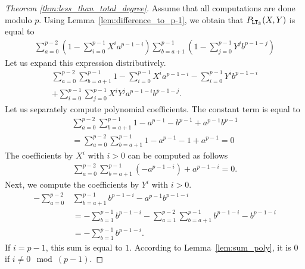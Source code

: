   \begin{proof}[Theorem \ref{thm:less_than_total_degree}]
    Assume that all computations are done modulo $p$.
    Using Lemma~\ref{lem:difference_to_p-1}, we obtain that $P_{\mathtt{LT}_{\mathcal{S}}}(X,Y)$ is equal to
    \begin{align*}
      \sum_{a = 0}^{p-2} \left(1-\sum_{i=0}^{p-1} X^i a^{p-1-i}\right) \sum_{b=a+1}^{p-1} \left(1-\sum_{j=0}^{p-1} Y^j b^{p-1-j}\right)
    \end{align*}
    Let us expand this expression distributively.
    \begin{align*}
      \sum_{a = 0}^{p-2} \sum_{b=a+1}^{p-1} 1 - \sum_{i=0}^{p-1} X^i a^{p-1-i} - \sum_{i=0}^{p-1} Y^i b^{p-1-i} \\
      + \sum_{i=0}^{p-1} \sum_{j=0}^{p-1} X^i Y^j a^{p-1-i} b^{p-1-j}.
    \end{align*}
    Let us separately compute polynomial coefficients.
    The constant term is equal to
    \begin{align*}
      \sum_{a = 0}^{p-2} \sum_{b=a+1}^{p-1} 1 - a^{p-1} - b^{p-1} + a^{p-1} b^{p-1} \\
      = \sum_{a = 0}^{p-2} \sum_{b=a+1}^{p-1} 1 - a^{p-1} - 1 + a^{p-1} = 0 
    \end{align*}
    The coefficients by $X^i$ with $i > 0$ can be computed as follows
    \begin{align*}
      \sum_{a = 0}^{p-2} \sum_{b=a+1}^{p-1} \left(-a^{p-1-i}\right) + a^{p-1-i} = 0.
    \end{align*}
    Next, we compute the coefficients by $Y^i$ with $i > 0$.
    \begin{align*}
      -\sum_{a = 0}^{p-2} &\sum_{b=a+1}^{p-1} b^{p-1-i} - a^{p-1} b^{p-1-i} \\
      &= -\sum_{b=1}^{p-1} b^{p-1-i} - \sum_{a = 1}^{p-2} \sum_{b=a+1}^{p-1} b^{p-1-i} - b^{p-1-i} \\
      &= -\sum_{b=1}^{p-1} b^{p-1-i}.
    \end{align*}
    If $i = p-1$, this sum is equal to $1$.
    According to Lemma~\ref{lem:sum_poly}, it is $0$ if $i \ne 0 \mod (p-1)$.
    

\end{proof}
